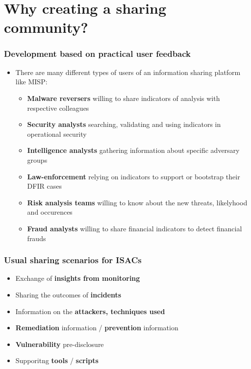 \section{Why creating a sharing\\ community?}

\begin{frame}
    \frametitle{Development based on practical user feedback}
    \begin{itemize}
        \item There are many different types of users of an information sharing platform like MISP:
        \begin{itemize}
            \item \textbf{Malware reversers} willing to share indicators of analysis with respective colleagues
            \item \textbf{Security analysts} searching, validating and using indicators in operational security
            \item \textbf{Intelligence analysts} gathering information about specific adversary groups
            \item \textbf{Law-enforcement} relying on indicators to support or bootstrap their DFIR cases
            \item \textbf{Risk analysis teams} willing to know about the new threats, likelyhood and occurences
            \item \textbf{Fraud analysts} willing to share financial indicators to detect financial frauds
        \end{itemize}
    \end{itemize}
\end{frame}

\begin{frame}
	\frametitle{Usual sharing scenarios for ISACs}
	\begin{itemize}
		\item Exchange of \textbf{insights from monitoring}
		\item Sharing the outcomes of \textbf{incidents}
		\item Information on the \textbf{attackers, techniques used}
		\item \textbf{Remediation} information / \textbf{prevention} information
		\item \textbf{Vulnerability} pre-disclosure
		\item Supporitng \textbf{tools} / \textbf{scripts}
	\end{itemize}
\end{frame}

